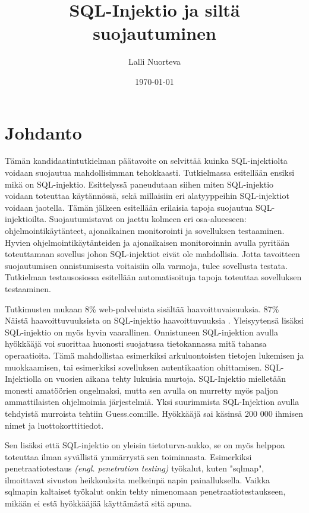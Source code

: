 \documentclass[finnish]{tktltiki2}
\title{SQL-Injektio ja siltä suojautuminen}
\author{Lalli Nuorteva}
\date{\today}
\theoremstyle{definition}
\theoremstyle{remark}
\begin{document}
	
	\frontmatter      %
	
	\maketitle        %
	
	\tableofcontents  %
	
	
	\mainmatter       %
	
	\section{Johdanto}
	Tämän kandidaatintutkielman päätavoite on selvittää kuinka SQL-injektiolta voidaan suojautua mahdollisimman tehokkaasti. Tutkielmassa esitellään ensiksi mikä on SQL-injektio. Esittelyssä paneudutaan siihen miten SQL-injektio voidaan toteuttaa käytännössä, sekä millaisiin eri alatyyppeihin SQL-injektiot voidaan jaotella. Tämän jälkeen esitellään erilaisia tapoja suojautua SQL-injektioilta. Suojautumistavat on jaettu kolmeen eri osa-alueeseen: ohjelmointikäytänteet, ajonaikainen monitorointi ja sovelluksen testaaminen. Hyvien ohjelmointikäytänteiden ja ajonaikaisen monitoroinnin avulla pyritään toteuttamaan sovellus johon SQL-injektiot eivät ole mahdollisia. Jotta tavoitteen suojautumisen onnistumisesta voitaisiin olla varmoja, tulee sovellusta testata. Tutkielman testausosiossa esitellään automatisoituja tapoja toteuttaa sovelluksen testaaminen.
	
	Tutkimusten mukaan 8\% web-palveluista sisältää haavoittuvaisuuksia.  87\% Näistä haavoittuvuuksista on SQL-injektio haavoittuvuuksia \cite{detection}. Yleisyytensä lisäksi SQL-injektio on myös hyvin vaarallinen. Onnistuneen SQL-injektion avulla hyökkääjä voi suorittaa huonosti suojatussa tietokannassa mitä tahansa operaatioita. Tämä mahdollistaa esimerkiksi arkuluontoisten tietojen lukemisen ja muokkaamisen, tai esimerkiksi sovelluksen autentikaation ohittamisen. SQL-Injektiolla on vuosien aikana tehty lukuisia murtoja. SQL-Injektio mielletään monesti amatöörien ongelmaksi, mutta  sen avulla on murretty myös paljon ammattilaisten ohjelmoimia järjestelmiä. Yksi suurimmista SQL-Injektion avulla tehdyistä murroista tehtiin Guess.com:ille. Hyökkääjä sai käsinsä 200 000 ihmisen nimet ja luottokorttitiedot.
	
	Sen lisäksi että SQL-injektio on yleisin tietoturva-aukko, se on myös helppoa toteuttaa ilman syvällistä ymmärrystä sen toiminnasta. Esimerkiksi penetraatiotestaus \textit{(engl. penetration testing)} työkalut, kuten "sqlmap"\space, ilmoittavat sivuston heikkouksita melkeinpä napin painalluksella. Vaikka sqlmapin kaltaiset työkalut onkin tehty nimenomaan penetraatiotestaukseen, mikään ei estä hyökkääjää käyttämästä sitä apuna.
	
\end{document}
